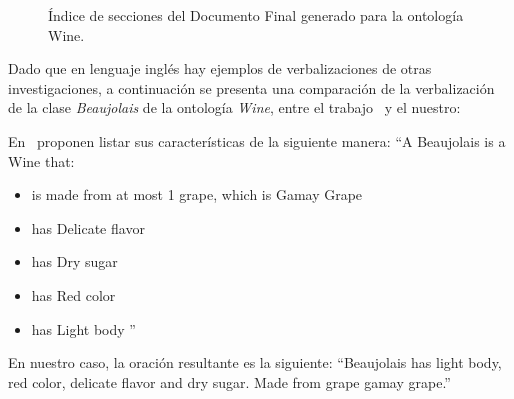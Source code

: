 \begin{figure}
\begin{multicols}{2}
{\small
\begin{figure}[H]
\end{figure}}  

\begin{figure}[H]
\end{figure}

\end{multicols}
\caption{Índice de secciones del Documento Final generado para la ontología Wine.}
\label{fig:indice_secciones_wine}
\end{figure}


Dado que en lenguaje inglés hay ejemplos de verbalizaciones de otras investigaciones, a continuación se presenta una comparación de la verbalización de la clase \emph{Beaujolais} de la ontología \emph{Wine}, entre el trabajo~\cite{hewlett2005effective} y el nuestro:

En~\cite{hewlett2005effective} proponen listar sus características de la siguiente manera: 
``A Beaujolais is a Wine that:
\begin{itemize}
    \item is made from at most 1 grape, which is Gamay Grape
    \item has Delicate flavor
    \item has Dry sugar 
    \item has Red color
    \item has Light body ''
\end{itemize}

En nuestro caso, la oración resultante es la siguiente:
``Beaujolais has light body, red color, delicate flavor and dry sugar. Made from grape gamay grape.''

